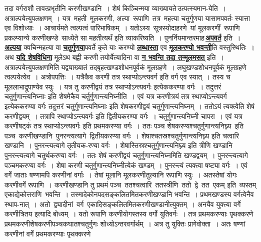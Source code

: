 \documentclass[11pt, openany]{book}
\begin{document}
{{\noindent तदा वर्गराशौ तावत्प्रभृतीनि करणीखण्डानि~। शेषं किञ्चिन्मया
व्याख्यायते\textendash \,उत्पत्स्यमान-येति~। अत्राल्पयेत्युपलक्षणम्~। यत्र \,महती \,मूलकरणी, अल्पा \,रूपाणि \,तत्र \,महत्या चतुर्गुणया यासामपवर्तः स्यात्ता एव
विशोध्याः~। आचार्यमते त्वल्पत्वं 
पारिभाषिकम्~। यतोऽस्य \,सूत्रस्योदाहरणे \,यां मूलकरणीं \,रूपाणि \,प्रकल्प्यान्ये करणीखण्डे \,साध्येते सा महतीत्यर्थं इति व्याकरिष्यति~। पुनर्नियमान्तरमाह\textendash \,\hyperref[44]{\textbf{अपवर्त}} इति~। \hyperref[44]{\textbf{अल्पया}} क्वचिन्महत्या वा \hyperref[44]{\textbf{चतुर्गुणया}}पवर्ते कृते याः करण्यो
\hyperref[44]{\textbf{लब्धास्ता}} एव \hyperref[44]{\textbf{मूलकरण्यो भवन्ती}}ति वस्तुस्थितिः~। अथ \hyperref[44]{\textbf{यदि शेषविधिना}} मूलेऽथ बह्वी करणी तयोर्येत्यादिना वा \hyperref[44]{\textbf{न भवन्ति तदा तन्मूलमसत्}} इति~। अत्राल्पयेत्युपलक्षणमिति यद्व्याख्यातं तद्बृहत्खण्डशोधनपूर्वकं मूलग्रहणे~। लघुखण्डशोधनपूर्वकं मूलग्रहणे त्वल्पयेत्येव~। अत्रोपपत्तिः~। यत्रैकैव करणी तत्र {\qt स्थाप्योऽन्त्यवर्ग} इति वर्ग एव स्यात्~। तस्य च
मूललाभाद्रूपाण्येव स्युः~। यत्र तु करणीद्वयं तत्र {\qt स्थाप्योऽन्त्यवर्गः}
इत्येककरण्या वर्गः~। तदुत्तरं {\qt चतुर्गुणान्त्यनिघ्नाः} इति शेषमेकैव
चर्तुर्गुणान्त्यनिघ्नीति~। एवं यत्र करणीत्रयं तत्र {\qt स्थाप्योऽन्त्यवर्ग}
इत्येककरण्या वर्गः
\newpage
\noindent तदुत्तरं {\qt चतुर्गुणान्त्यनिघ्नाः} इति शेषकरणीद्वयं चतुर्गुणान्त्यनिघ्नम्~। ततोऽयं 
त्यक्त्वेति शेषं करणीद्वयम्~। तत्रापि {\qt स्थाप्योऽन्त्यवर्गः }इति
द्वितीयकरण्या वर्गः~। चतुर्गुणान्त्यनिघ्नी चापरा~। एवं यत्र करणीषट्कं
तत्र {\qt स्थाप्योऽन्त्यवर्गः} इति 
प्रथमकरण्या वर्गः~। ततः पञ्च शेषकरण्यश्चतुर्गुणान्त्यनिघ्न्य\, इति \,पञ्च \,करणीखण्डानि \,पुनरन्त्यत्यागे \,द्वितीयकरण्या वर्गः~।
शेषाश्चतस्रश्चतुर्गुणान्त्यनिघ्न्य इति चत्वारि खण्डानि~। पुनरन्त्यत्यागे
तृतीयक-रण्या वर्गः~। शेषास्तिस्रश्चतुर्गुणान्त्यनिघ्न्य इति त्रीणि
खण्डानि पुनरन्त्यत्यागे चतुर्थकरण्या वर्गः~। ततः शेषं करणीद्वयं
चतुर्गुणान्त्यनिघ्नमिति खण्डद्वयम्~। पुनरन्त्यत्यागे पञ्चमकरण्या वर्गः~। शेषा करणी चतुर्गुणान्त्यनिघ्नीत्येकं खण्डम्~। पुनरन्त्यं त्यक्त्वा
षष्ट्या वर्गः~। एवं वर्गे जाताः षण्णामपि करणीनां वर्गाः~। तेषां मूलानि
मूलकरणीतुल्यानि रूपाणि स्युः~। अतस्तेषां योगः करणीवर्गे रूपाणि~।
करणीखण्डानि तु प्रथमं पञ्च \,ततश्चत्वारि \,ततस्त्रीणि \,ततो \,द्वे \,तत \,एकम् इति \,व्यस्तम् एकाद्येकोत्तराणि \,भवन्ति~। तस्मादेकोनपदसङ्कलितमितकरणीखण्डानि भवन्ति~। प्रथमखण्डस्य वर्गत्वेनैव स्थाप-नात्~। अतो \,द्व्यादीनां \,वर्ग \,एकादिसङ्कलितमितकरणीखण्डानीत्युक्तम्~। अनयैव युक्त्या वर्गे
करणीत्रितय इत्यादि बोध्यम्~। यतो रूपाणि करणीयोगस्तस्य वर्गो युतिवर्गः~।
तत्र प्रथमकरण्याः पृथक्करणे प्रथमकरणीशेषकरणीपञ्चकघातश्चतुर्गुणः शोध्योऽन्तरवर्गार्थम्~। अत्र तु युक्तिः प्रागेवोक्ता~। अतः षण्णां करणीनां वर्गे प्रथमकरण्याः पृथक्करणे
}}
\end{document}
